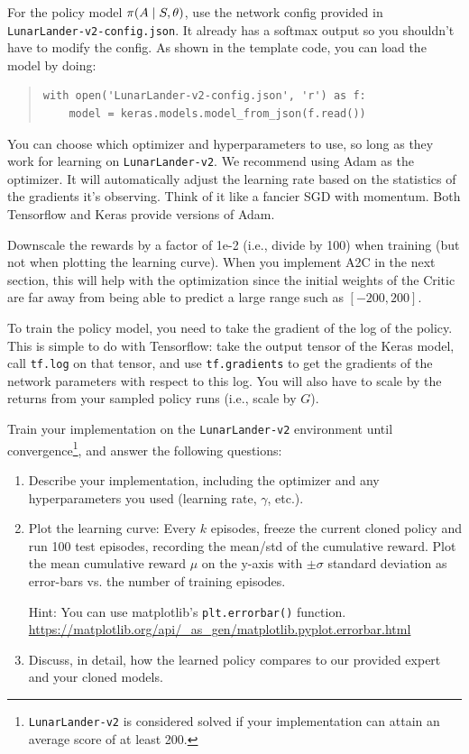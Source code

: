 \documentclass[12pt]{article}
\begin{document}
For the policy model $\pi(A \mid S, \bf{\theta})$, use the network config provided in \\\texttt{LunarLander-v2-config.json}. It already has a softmax output so you shouldn't have to modify the config. As shown in the template code, you can load the model by doing:
\begin{quote}
\begin{verbatim}
with open('LunarLander-v2-config.json', 'r') as f:
    model = keras.models.model_from_json(f.read())
\end{verbatim}
\end{quote}
You can choose which optimizer and hyperparameters to use, so long as they work for learning on \texttt{LunarLander-v2}. We recommend using Adam as the optimizer. It will automatically adjust the learning rate based on the statistics of the gradients it's observing. Think of it like a fancier SGD with momentum. Both Tensorflow and Keras provide versions of Adam.

Downscale the rewards by a factor of 1e-2 (i.e., divide by 100) when training (but not when plotting the learning curve). When you implement A2C in the next section, this will help with the optimization since the initial weights of the Critic are far away from being able to predict a large range such as $[-200, 200]$.

To train the policy model, you need to take the gradient of the log of the policy. This is simple to do with Tensorflow: take the output tensor of the Keras model, call \texttt{tf.log} on that tensor, and use \texttt{tf.gradients} to get the gradients of the network parameters with respect to this log. You will also have to scale by the returns from your sampled policy runs (i.e., scale by $G$).

Train your implementation on the \texttt{LunarLander-v2} environment until convergence\footnote{\texttt{LunarLander-v2} is considered solved if your implementation can attain an average score of at least 200.}, and answer the following questions:

\begin{enumerate}
\item Describe your implementation, including the optimizer and any hyperparameters you used (learning rate, $\gamma$, etc.).

\item  Plot the learning curve: Every $k$ episodes, freeze the current cloned policy and run 100 test episodes, recording the mean/std of the cumulative reward. Plot the mean cumulative reward $\mu$ on the y-axis with $\pm \sigma$ standard deviation as error-bars vs. the number of training episodes.

Hint: You can use matplotlib's \texttt{plt.errorbar()} function. \url{https://matplotlib.org/api/\_as\_gen/matplotlib.pyplot.errorbar.html}

\item Discuss, in detail, how the learned policy compares to our provided expert and your cloned models.
\end{enumerate}
\end{document}
